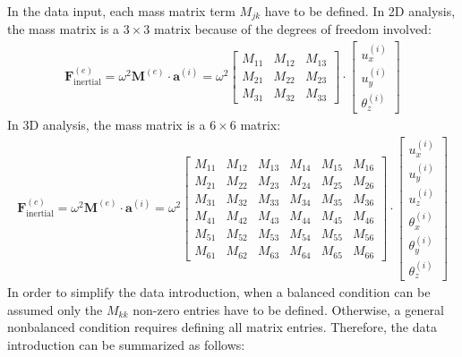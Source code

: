 \documentclass[a4paper,fleqn]{book}
\begin{document}
In the data input, each mass matrix term $M_{jk}$ have to be defined. In 2D analysis, the mass matrix is a $3\times3$ matrix because of the degrees of freedom involved:
\begin{align}
\mathbf{F}_\mathrm{inertial}^{(e)}
=
\omega^2
\mathbf{M}^{(e)}
\cdot
\mathbf{a}^{(i)}
=
\omega^2
\left[
\begin{array}{ccc}
M_{11} & M_{12} & M_{13} \\
M_{21} & M_{22} & M_{23} \\
M_{31} & M_{32} & M_{33}
\end{array}
\right]
\cdot
\left[
\begin{array}{c}
u_x^{(i)} \\ u_y^{(i)} \\ \theta_z^{(i)}
\end{array}
\right]
\end{align}
In 3D analysis, the mass matrix is a $6\times6$ matrix:
\begin{align}
\mathbf{F}_\mathrm{inertial}^{(e)}
=
\omega^2
\mathbf{M}^{(e)}
\cdot
\mathbf{a}^{(i)}
=
\omega^2
\left[
\begin{array}{cccccc}
M_{11} & M_{12} & M_{13} & M_{14} & M_{15} & M_{16} \\
M_{21} & M_{22} & M_{23} & M_{24} & M_{25} & M_{26} \\
M_{31} & M_{32} & M_{33} & M_{34} & M_{35} & M_{36} \\
M_{41} & M_{42} & M_{43} & M_{44} & M_{45} & M_{46} \\
M_{51} & M_{52} & M_{53} & M_{54} & M_{55} & M_{56} \\
M_{61} & M_{62} & M_{63} & M_{64} & M_{65} & M_{66} 
\end{array}
\right]
\cdot
\left[
\begin{array}{c}
u_x^{(i)} \\ u_y^{(i)} \\ u_z^{(i)} \\ \theta_x^{(i)} \\ \theta_y^{(i)} \\ \theta_z^{(i)}
\end{array}
\right]
\end{align}
In order to simplify the data introduction, when a balanced condition can be assumed only the $M_{kk}$ non-zero entries have to be defined. Otherwise, a general nonbalanced condition requires defining all matrix entries. Therefore, the data introduction can be summarized as follows:
\end{document}
